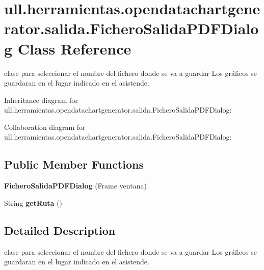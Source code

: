 \hypertarget{classull_1_1herramientas_1_1opendatachartgenerator_1_1salida_1_1_fichero_salida_p_d_f_dialog}{}\section{ull.\+herramientas.\+opendatachartgenerator.\+salida.\+Fichero\+Salida\+P\+D\+F\+Dialog Class Reference}
\label{classull_1_1herramientas_1_1opendatachartgenerator_1_1salida_1_1_fichero_salida_p_d_f_dialog}


clase para seleccionar el nombre del fichero donde se va a guardar Los gráficos se guardaran en el lugar indicado en el asistende.  




Inheritance diagram for ull.\+herramientas.\+opendatachartgenerator.\+salida.\+Fichero\+Salida\+P\+D\+F\+Dialog\+:


Collaboration diagram for ull.\+herramientas.\+opendatachartgenerator.\+salida.\+Fichero\+Salida\+P\+D\+F\+Dialog\+:
\subsection*{Public Member Functions}
\begin{DoxyCompactItemize}
\item 
\mbox{\label{classull_1_1herramientas_1_1opendatachartgenerator_1_1salida_1_1_fichero_salida_p_d_f_dialog_a5b00d3d6fb6d88da7c19dbaa6f1f35de}} 
{\bfseries Fichero\+Salida\+P\+D\+F\+Dialog} (Frame ventana)
\item 
\mbox{\label{classull_1_1herramientas_1_1opendatachartgenerator_1_1salida_1_1_fichero_salida_p_d_f_dialog_ac2ddcc165ca7edb969df54f7c9486713}} 
String {\bfseries get\+Ruta} ()
\end{DoxyCompactItemize}


\subsection{Detailed Description}
clase para seleccionar el nombre del fichero donde se va a guardar Los gráficos se guardaran en el lugar indicado en el asistende. 

